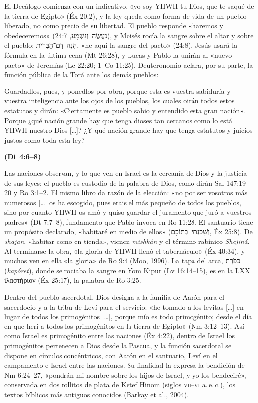 \documentclass[11pt,letterpaper]{article}
\newcommand{\heb}[1]{\mbox{\foreignlanguage{hebrew}{#1}}}
\newcommand{\grc}[1]{\foreignlanguage{ancientgreek}{#1}}
\newcommand{\fuente}[1]{\par\hfill{\upshape\bfseries\small\textcolor{ladrillo}{#1}}}
\begin{document}
El Decálogo comienza con un indicativo, «yo soy YHWH tu Dios, que te saqué de la tierra de Egipto» (Éx 20:2), y la ley queda como forma de vida de un pueblo liberado, no como precio de su libertad. El pueblo responde «haremos y obedeceremos» (\heb{נַעֲשֶׂה וְנִשְׁמָע}, 24:7), y Moisés rocía la sangre sobre el altar y sobre el pueblo: \heb{הִנֵּה דַם־הַבְּרִית}, «he aquí la sangre del pacto» (24:8). Jesús usará la fórmula en la última cena (Mt 26:28), y Lucas y Pablo la unirán al «nuevo pacto» de Jeremías (Lc 22:20; 1~Co 11:25). Deuteronomio aclara, por su parte, la función pública de la Torá ante los demás pueblos:

\begin{cita}Guardadlos, pues, y ponedlos por obra, porque esta es vuestra sabiduría y vuestra inteligencia ante los ojos de los pueblos, los cuales oirán todos estos estatutos y dirán: «Ciertamente es pueblo sabio y entendido esta gran nación». Porque ¿qué nación grande hay que tenga dioses tan cercanos como lo está YHWH nuestro Dios [\ldots]? ¿Y qué nación grande hay que tenga estatutos y juicios justos como toda esta ley?\fuente{(Dt 4:6--8)}\end{cita}

Las naciones observan, y lo que ven en Israel es la cercanía de Dios y la justicia de sus leyes; el pueblo es custodio de la palabra de Dios, como dirán Sal 147:19–20 y Ro 3:1–2. El mismo libro da razón de la elección: «no por ser vosotros más numerosos [\ldots] os ha escogido, pues erais el más pequeño de todos los pueblos, sino por cuanto YHWH os amó y quiso guardar el juramento que juró a vuestros padres» (Dt 7:7–8), fundamento que Pablo invoca en Ro 11:28. El santuario tiene un propósito declarado, «habitaré en medio de ellos» (\heb{וְשָׁכַנְתִּי בְּתוֹכָם}, Éx 25:8). De \emph{shajan}, «habitar como en tienda», vienen \emph{mishkán} y el término rabínico \emph{Shejiná}. Al terminarse la obra, «la gloria de YHWH llenó el tabernáculo» (Éx 40:34), y muchos ven en ella «la gloria» de Ro 9:4 (Moo, 1996). La tapa del arca, \heb{כַּפֹּרֶת} (\emph{kapóret}), donde se rociaba la sangre en Yom Kipur (Lv 16:14–15), es en la LXX \grc{ἱλαστήριον} (Éx 25:17), la palabra de Ro 3:25.

Dentro del pueblo sacerdotal, Dios designa a la familia de Aarón para el sacerdocio y a la tribu de Leví para el servicio: «he tomado a los levitas [\ldots] en lugar de todos los primogénitos [\ldots], porque mío es todo primogénito; desde el día en que herí a todos los primogénitos en la tierra de Egipto» (Nm 3:12–13). Así como Israel es primogénito entre las naciones (Éx 4:22), dentro de Israel los primogénitos pertenecen a Dios desde la Pascua, y la función sacerdotal se dispone en círculos concéntricos, con Aarón en el santuario, Leví en el campamento e Israel entre las naciones. Su finalidad la expresa la bendición de Nm 6:24–27, «pondrán mi nombre sobre los hijos de Israel, y yo los bendeciré», conservada en dos rollitos de plata de Ketef Hinom (siglos \textsc{vii}–\textsc{vi} a.\,e.\,c.), los textos bíblicos más antiguos conocidos (Barkay et al., 2004).
\end{document}
